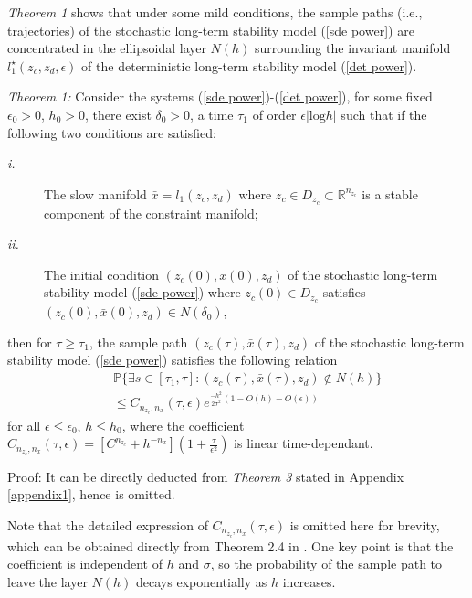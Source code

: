 \documentclass[journal]{IEEEtran}
\newcommand{\ee}{\epsilon}
\begin{document}
\textit{Theorem 1} shows that under some mild conditions,
the sample paths (i.e., trajectories) of the stochastic long-term stability model (\ref{sde power}) are concentrated in the ellipsoidal layer $N(h)$ surrounding the invariant manifold $l_1^\star(z_c,z_d,\ee)$ of the deterministic long-term stability model (\ref{det power}).









\textit{Theorem 1:} Consider the systems (\ref{sde power})-(\ref{det power}), for some fixed $\ee_0>0$, $h_0>0$, there exist $\delta_0>0$, a time $\tau_1$ of order $\ee|\mbox{log}h|$ such that if the following two conditions are satisfied:

\begin{description}
\item [\textit{i.}] The slow manifold $\bar{x}=l_1(z_c,z_d)$ where $z_c\in D_{z_c}\subset\mathbb{R}^{n_{z_c}}$ is a stable component of the constraint manifold;
\item [\textit{ii.}] The initial condition $(z_c(0),\bar{x}(0),z_d)$ of the stochastic long-term stability model (\ref{sde power}) where $z_c(0)\in D_{z_c}$ satisfies $(z_c(0),\bar{x}(0),z_d)\in N(\delta_0)$, \end{description}

then for $\tau\geq\tau_1$, the sample path $(z_c(\tau),\bar{x}(\tau),z_d)$ of the stochastic long-term stability model (\ref{sde power}) satisfies  the following relation
\begin{eqnarray}\label{theorem2}
&&\mathbb{P}\{\exists s\in[\tau_1,\tau]:(z_c(\tau),\bar{x}(\tau),z_d)\notin N(h)\}\nonumber\\
&&\leq C_{n_{z_c},n_x}(\tau,\ee)e^{\frac{-h^2}{2\sigma^2}(1-O(h)-O(\ee))}
\end{eqnarray}
for all $\ee\leq\ee_0$, $h\leq h_0$, where the coefficient $C_{n_{z_c},n_x}(\tau,\ee)=[C^{n_{z_c}}+h^{-n_x}](1+\frac{\tau}{\ee^2})$ is linear time-dependant.

Proof: It can be directly deducted from \textit{Theorem 3} stated in Appendix \ref{appendix1}, hence is omitted.

Note that the detailed expression of $C_{n_{z_c},n_x}(\tau,\ee)$ is omitted here for brevity, which can be obtained directly from Theorem 2.4 in \cite{Gentz:2003}. One key point is that the coefficient is independent of $h$ and $\sigma$, so the probability of the sample path to leave the layer $N(h)$ decays exponentially as $h$ increases. 
\end{document}
